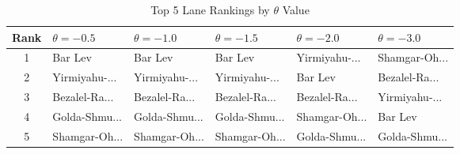 \begin{table}[H]
\centering
\caption{Top 5 Lane Rankings by $\theta$ Value}
\label{tab:sensitivity_theta}
\begin{tabular}{@{}clllll@{}}
\toprule
\textbf{Rank} & $\theta=-0.5$ & $\theta=-1.0$ & $\theta=-1.5$ & $\theta=-2.0$ & $\theta=-3.0$ \\
\midrule
1 & Bar Lev & Bar Lev & Bar Lev & Yirmiyahu-... & Shamgar-Oh... \\
2 & Yirmiyahu-... & Yirmiyahu-... & Yirmiyahu-... & Bar Lev & Bezalel-Ra... \\
3 & Bezalel-Ra... & Bezalel-Ra... & Bezalel-Ra... & Bezalel-Ra... & Yirmiyahu-... \\
4 & Golda-Shmu... & Golda-Shmu... & Golda-Shmu... & Shamgar-Oh... & Bar Lev \\
5 & Shamgar-Oh... & Shamgar-Oh... & Shamgar-Oh... & Golda-Shmu... & Golda-Shmu... \\
\bottomrule
\end{tabular}
\end{table}

